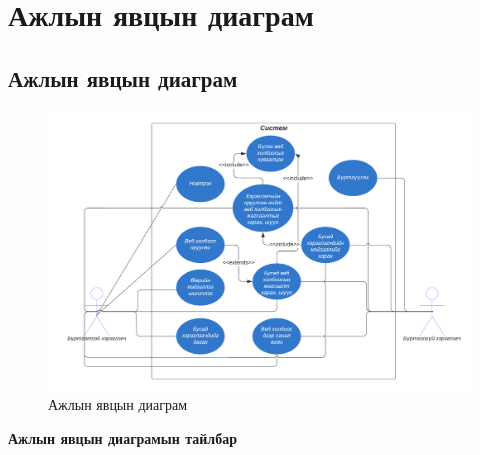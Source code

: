 




\pagebreak
\section{Ажлын явцын диаграм}

\subsection{Ажлын явцын диаграм}
\begin{figure}[h]
	\centering
	\includegraphics[width=15cm]{images/usecase.png}
	\caption{Ажлын явцын диаграм}
	\label{fig:usecase}
\end{figure}

\textbf{Ажлын явцын диаграмын тайлбар}

